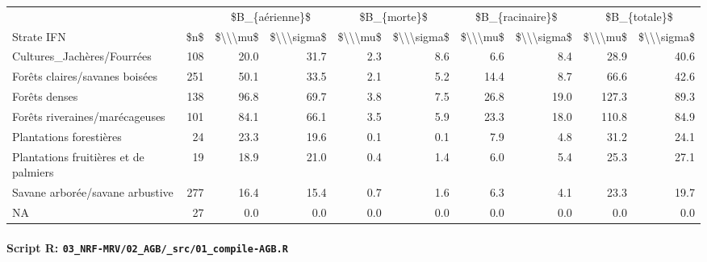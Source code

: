 \documentclass[a4paper, notitlepage, 12pt, krantz2]{krantz}
\let\oldparagraph\paragraph
\renewcommand{\paragraph}[1]{\oldparagraph{#1}\mbox{}}
\begin{document}
\begin{table}[H]
\centering
\begin{tabular}{l|r|r|r|r|r|r|r|r|r}
\hline
\multicolumn{1}{c|}{ } & \multicolumn{1}{c|}{ } & \multicolumn{2}{c|}{\$B\_\{aérienne\}\$} & \multicolumn{2}{c|}{\$B\_\{morte\}\$} & \multicolumn{2}{c|}{\$B\_\{racinaire\}\$} & \multicolumn{2}{c}{\$B\_\{totale\}\$} \\
\cline{3-4} \cline{5-6} \cline{7-8} \cline{9-10}
Strate IFN & \$n\$ & \$\textbackslash{}\textbackslash{}\textbackslash{}mu\$ & \$\textbackslash{}\textbackslash{}\textbackslash{}sigma\$ & \$\textbackslash{}\textbackslash{}\textbackslash{}mu\$ & \$\textbackslash{}\textbackslash{}\textbackslash{}sigma\$ & \$\textbackslash{}\textbackslash{}\textbackslash{}mu\$ & \$\textbackslash{}\textbackslash{}\textbackslash{}sigma\$ & \$\textbackslash{}\textbackslash{}\textbackslash{}mu\$ & \$\textbackslash{}\textbackslash{}\textbackslash{}sigma\$\\
\hline
Cultures\_Jachères/Fourrées & 108 & 20.0 & 31.7 & 2.3 & 8.6 & 6.6 & 8.4 & 28.9 & 40.6\\
\hline
Forêts claires/savanes boisées & 251 & 50.1 & 33.5 & 2.1 & 5.2 & 14.4 & 8.7 & 66.6 & 42.6\\
\hline
Forêts denses & 138 & 96.8 & 69.7 & 3.8 & 7.5 & 26.8 & 19.0 & 127.3 & 89.3\\
\hline
Forêts riveraines/marécageuses & 101 & 84.1 & 66.1 & 3.5 & 5.9 & 23.3 & 18.0 & 110.8 & 84.9\\
\hline
Plantations forestières & 24 & 23.3 & 19.6 & 0.1 & 0.1 & 7.9 & 4.8 & 31.2 & 24.1\\
\hline
Plantations fruitières et de palmiers & 19 & 18.9 & 21.0 & 0.4 & 1.4 & 6.0 & 5.4 & 25.3 & 27.1\\
\hline
Savane arborée/savane arbustive & 277 & 16.4 & 15.4 & 0.7 & 1.6 & 6.3 & 4.1 & 23.3 & 19.7\\
\hline
NA & 27 & 0.0 & 0.0 & 0.0 & 0.0 & 0.0 & 0.0 & 0.0 & 0.0\\
\hline
\end{tabular}
\end{table}

\hypertarget{script-r-03_nrf-mrv02_agb_src01_compile-agb.r}{%
\paragraph{\texorpdfstring{Script R: \texttt{03\_NRF-MRV/02\_AGB/\_src/01\_compile-AGB.R}}{Script R: 03\_NRF-MRV/02\_AGB/\_src/01\_compile-AGB.R}}\label{script-r-03_nrf-mrv02_agb_src01_compile-agb.r}}
\end{document}
